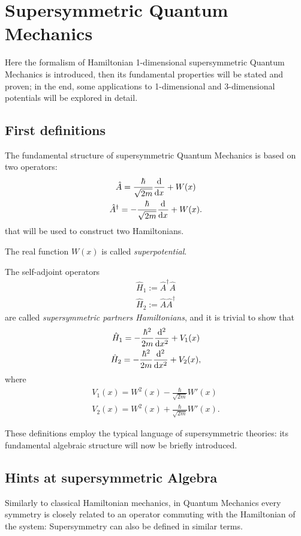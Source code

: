 \chapter{Supersymmetric Quantum Mechanics}
\thispagestyle{empty}
Here the formalism of Hamiltonian 1-dimensional supersymmetric Quantum Mechanics 
is introduced, then its fundamental properties will be stated and proven; in the
end, some applications to 1-dimensional and 3-dimensional potentials will be
explored in detail.
\section{First definitions}
The fundamental structure of supersymmetric Quantum Mechanics is based on two
operators:
\begin{gather*}
\hat A = \frac{\hbar}{\sqrt{2m}}\dv[]{}{x} + W(x)\\
\hat A^\dagger = -\frac{\hbar}{\sqrt{2m}}\dv[]{}{x} + W(x).
\end{gather*}
that will be used to construct two Hamiltonians.
\begin{defn}
The real function $W(x)$ is called \textit{superpotential}.
\end{defn}
\begin{defn}
The self-adjoint operators
\begin{gather}
\hat H_1 := \hat A^\dagger\hat A \label{def:H1}\\
\hat H_2 := \hat A\hat A^\dagger \label{def:H2}
\end{gather}
are called \textit{supersymmetric partners Hamiltonians}, and it is trivial to show that
\begin{gather*}
\hat H_1 = -\frac{\hbar^2}{2m}\dv[2]{}{x} + V_1(x)\\
\hat H_2 = -\frac{\hbar^2}{2m}\dv[2]{}{x} + V_2(x),
\end{gather*}
where 
\begin{gather}
V_1(x) = W^2(x)-\frac{\hbar}{\sqrt{2m}}W'(x)\label{eq:V_1}\\
V_2(x) = W^2(x)+\frac{\hbar}{\sqrt{2m}}W'(x)\label{eq:V_2}.
\end{gather}
\end{defn}
These definitions employ the typical language of supersymmetric theories: its
fundamental algebraic structure will now be briefly introduced.
\newpage
\section{Hints at supersymmetric Algebra}
\label{sec:susy_algebra}
Similarly to classical Hamiltonian mechanics, in Quantum Mechanics every symmetry
is closely related to an operator commuting with the
Hamiltonian of the system: Supersymmetry can also be defined in similar terms.

